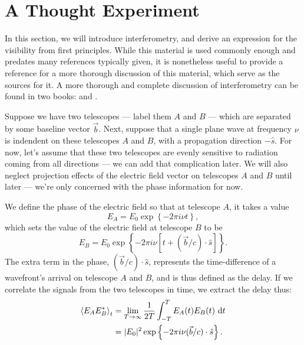 \section{A Thought Experiment}\label{sec:interferometry}

In this section, we will introduce interferometry, and derive an expression for the visibility
from first principles. While this material is used commonly enough and predates many
references typically given, it is nonetheless useful to provide a reference for a more thorough
discussion of this material, which serve as the sources for it. A more thorough and complete
discussion of interferometry can be found in two books: \citet{WhiteBook} and \citet{TMS}.

Suppose we have two telescopes --- label them $A$ and $B$ --- which are separated by some
baseline vector $\vec{b}$. Next, suppose that a single
plane wave at frequency $\nu$ is indendent on
these telescopes $A$ and $B$, with a propagation direction
$-\hat{s}$. For now, let's assume that
these two telescopes are evenly sensitive to radiation coming from all directions --- we can add that
complication later. We will also neglect projection effects of the electric field vector on
telescopes $A$ and $B$ until later --- we're only concerned with the phase information for now.

We define the phase of the electric field so that at telescope $A$, it takes a value 
\begin{equation}
  E_A = E_0\exp\left\{-2\pi i\nu t\right\}, 
\end{equation}
which sets the value of the electric field at telescope $B$ to be
\begin{equation}
  E_B = E_0\exp\left\{-2\pi i\nu [t + (\vec{b}/c)\cdot\hat{s}]\right\}.
\end{equation}
The extra term in the phase, $(\vec{b}/c)\cdot\hat{s}$, represents the time-difference of a
wavefront's arrival on telescope $A$ and $B$, and is thus defined as the delay. If we correlate the
signals from the two telescopes in time, we extract the delay thus:
\begin{align}
  \left\langle E_A E_B^* \right\rangle_t &= 
    \lim_{T\to\infty} \frac{1}{2T}\int^T_{-T} E_A(t)E_B(t)\ {\rm d}t \\ 
    &= |E_0|^2\exp\left\{-2\pi i \nu (\vec{b}/c)\cdot\hat{s}\right\}.
\end{align}


